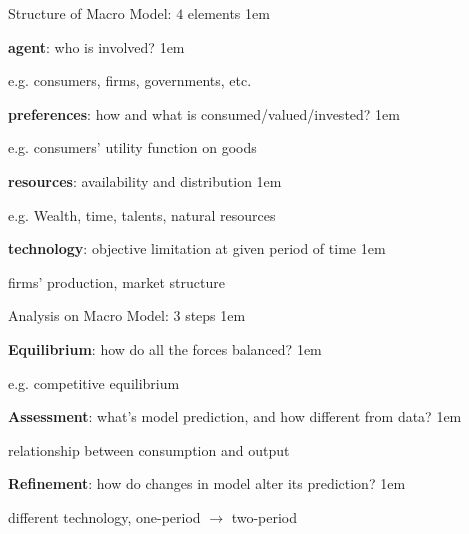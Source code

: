 \documentclass[11pt,aspectratio=43]{beamer}
\let\olditemize=\itemize
\let\endolditemize=\enditemize
\renewenvironment{itemize}{\olditemize \itemsep1em}{\endolditemize}
\let\oldenumerate=\enumerate
\let\endoldenumerate=\endenumerate
\renewenvironment{enumerate}{\oldenumerate \itemsep1em}{ \endoldenumerate}
\theoremstyle{definition}
\begin{document}
\begin{frame}{Structure of Macro Model: $ 4 $ elements}
\label{slide:Structure_of_Macro_Model____4___elements}
\begin{enumerate}
    \item \textbf{agent}: who is involved?
    \begin{itemize}
        \item e.g. consumers, firms, governments, etc.
    \end{itemize}
    \item \textbf{preferences}: how and what is consumed/valued/invested?
    \begin{itemize}
        \item e.g. consumers' utility function on goods
    \end{itemize}
    \item \textbf{resources}: availability and distribution
    \begin{itemize}
        \item e.g. Wealth, time, talents, natural resources
    \end{itemize}
    \item \textbf{technology}: objective limitation at given period of time
    \begin{itemize}
        \item firms' production, market structure
    \end{itemize}
\end{enumerate}
\end{frame}

\begin{frame}{Analysis on Macro Model: $ 3 $ steps}
\label{slide:Analysis_on_Macro_Model____3___steps}
    \begin{enumerate}
        \item \textbf{Equilibrium}: how do all the forces balanced?
        \begin{itemize}
            \item e.g. competitive equilibrium
        \end{itemize}
        \item \textbf{Assessment}: what's model prediction, and how different from data?
        \begin{itemize}
            \item relationship between consumption and output
        \end{itemize}
        \item \textbf{Refinement}: how do changes in model alter its prediction?
        \begin{itemize}
            \item different technology, one-period $ \rightarrow  $ two-period
        \end{itemize}
    \end{enumerate}
\end{frame}
\end{document}
